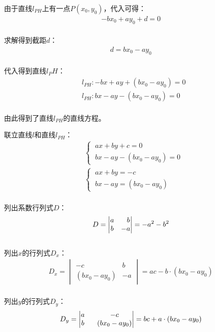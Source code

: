 \documentclass[UTF8]{ctexart}
\begin{document}
    由于直线$l_{PH}$上有一点$P(x_0,y_0)$，代入可得：
    \begin{align}
        -bx_0+ay_0+d=0
    \end{align}\\
    求解得到截距$d$：
    \begin{align}
        d=bx_0-ay_0
    \end{align}\\
    代入得到直线$l_PH$：
    \begin{align}
        &l_{PH}:-bx+ay+(bx_0-ay_0)=0\\[3mm]
        &l_{PH}:bx-ay-(bx_0-ay_0)=0
    \end{align}\\
    由此得到了直线$l_{PH}$的直线方程。
    
\newpage

    联立直线$l$和直线$l_{PH}$：
    \begin{align}
        &\begin{cases}
            ~ax+by+c=0\\
            ~bx-ay-(bx_0-ay_0)=0
        \end{cases}\\[6mm]
        &\begin{cases}
            ~ax+by=-c\\
            ~bx-ay=(bx_0-ay_0)
        \end{cases}
    \end{align}\\
    列出系数行列式$D$：
    \begin{align}
        D=\begin{vmatrix}a&\hphantom{-}b\\b&-a\end{vmatrix}=-a^2-b^2
    \end{align}\\
    列出$x$的行列式$D_x$：
    \begin{align}
        D_x=\begin{vmatrix}-c&b\\(bx_0-ay_0)&-a\end{vmatrix}=ac-b\cdot(bx_0-ay_0)
    \end{align}\\
    列出$y$的行列式$D_y$：
    \begin{align}
        D_y=\begin{vmatrix}a\hphantom{-}&-c\\b\hphantom{-}&(bx_0-ay_0)\end{vmatrix}=bc+a\cdot(bx_0-ay_0)
    \end{align}\\
\end{document}
